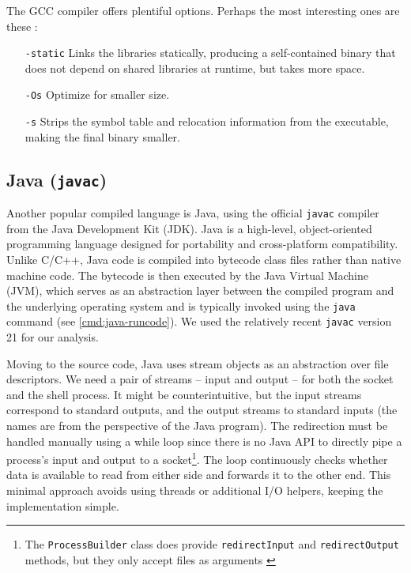 The GCC compiler offers plentiful options. Perhaps the most interesting ones are these \cite{gcc-man}:

\setlength{\leftmargini}{5em}
\begin{itemize}
\item[\texttt{-static}] Links the libraries statically, producing a self-contained binary that does not depend on shared libraries at runtime, but takes more space.
\item[\texttt{-Os}] Optimize for smaller size.
\item[\texttt{-s}] Strips the symbol table and relocation information from the executable, making the final binary smaller.
\end{itemize}
\setlength{\leftmargini}{2.5em}


\subsection{Java (\texttt{javac})}
\label{sec:java}


Another popular compiled language is Java, using the official \texttt{javac} compiler from the Java Development Kit (JDK). Java is a high-level, object-oriented programming language designed for portability and cross-platform compatibility. Unlike C/C++, Java code is compiled into bytecode class files rather than native machine code. The bytecode is then executed by the Java Virtual Machine (JVM), which serves as an abstraction layer between the compiled program and the underlying operating system \cite{javac-doc} and is typically invoked using the \texttt{java} command (see \cref{cmd:java-runcode}). We used the relatively recent \texttt{javac} version 21 for our analysis.

Moving to the source code, Java uses stream objects as an abstraction over file descriptors. We need a pair of streams -- input and output -- for both the socket and the shell process. It might be counterintuitive, but the input streams correspond to standard outputs, and the output streams to standard inputs (the names are from the perspective of the Java program). The redirection must be handled manually using a while loop since there is no Java API to directly pipe a process's input and output to a socket\footnote{The \texttt{ProcessBuilder} class does provide \texttt{redirectInput} and \texttt{redirectOutput} methods, but they only accept files as arguments \cite{processbuilder-doc}}. The loop continuously checks whether data is available to read from either side and forwards it to the other end. This minimal approach avoids using threads or additional I/O helpers, keeping the implementation simple.

